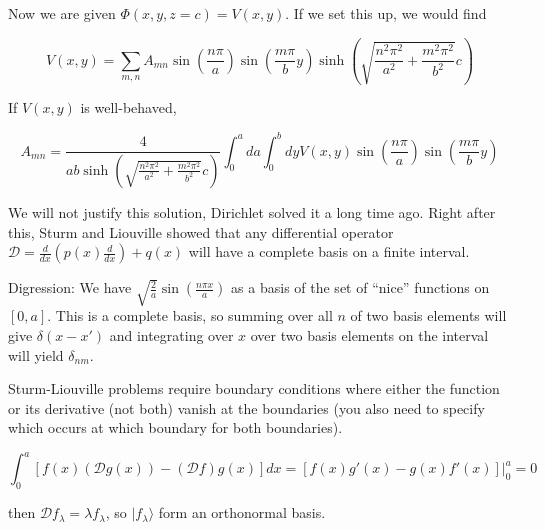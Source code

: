 \documentclass[a4paper,twoside,master.tex]{subfiles}
\begin{document}
Now we are given $\Phi(x,y,z=c) = V(x,y)$. If we set this up, we would find

\begin{equation}
   V(x,y)=\sum_{m,n}A_{mn}\sin(\frac{n\pi}{a})\sin(\frac{m\pi}{b}y)\sinh(\sqrt{\frac{n^2\pi^2}{a^2}+\frac{m^2\pi^2}{b^2}}c)
\end{equation}

If $V(x,y)$ is well-behaved,

\begin{equation}
   A_{mn} = \frac{4}{ab\sinh(\sqrt{\frac{n^2\pi^2}{a^2}+\frac{m^2\pi^2}{b^2}}c)}\int_0^a da\int_0^b dy V(x,y)\sin(\frac{n\pi}{a})\sin(\frac{m\pi}{b}y)
\end{equation}

We will not justify this solution, Dirichlet solved it a long time ago. Right after this, Sturm and Liouville showed that any differential operator $\mathcal{D} = \frac{d}{dx}(p(x)\frac{d}{dx}) + q(x)$ will have a complete basis on a finite interval.

\begin{note}{Digression:}
We have $\sqrt{\frac{2}{a}}\sin(\frac{n\pi x}{a})$ as a basis of the set of ``nice'' functions on $[0,a]$. This is a complete basis, so summing over all $n$ of two basis elements will give $\delta(x-x')$ and integrating over $x$ over two basis elements on the interval will yield $\delta_{nm}$.
\end{note}

Sturm-Liouville problems require boundary conditions where either the function or its derivative (not both) vanish at the boundaries (you also need to specify which occurs at which boundary for both boundaries).

\begin{equation}
   \int_0^a[f(x)(\mathcal{D}g(x)) - (\mathcal{D}f)g(x)]dx = [f(x)g'(x)-g(x)f'(x)]\bigg|_0^a = 0
\end{equation}

then $\mathcal{D}f_\lambda = \lambda f_\lambda$, so $|f_\lambda\rangle$ form an orthonormal basis.
\end{document}
